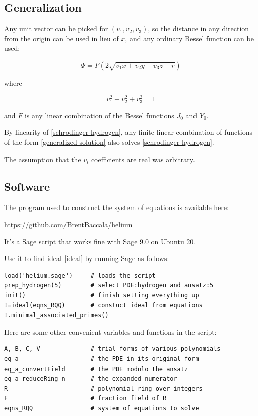 \documentclass{article}
\begin{document}
\subsection*{Generalization}
\parskip 12pt

Any unit vector can be picked for $(v_1, v_2, v_3)$,
so the distance in any direction from the origin can be used in lieu of $x$,
and any ordinary Bessel function can be used:

\begin{equation}
\label{generalized solution}
\Psi = F(2\sqrt{v_1 x+ v_2 y+ v_3 z+r})
\end{equation}

where

\begin{equation*}
v_1^2+v_2^2+v_3^2=1
\end{equation*}

and $F$ is any linear combination of the Bessel functions $J_0$ and $Y_0$.

By linearity of \eqref{schrodinger hydrogen}, any finite linear combination of functions of the form
\eqref{generalized solution} also solves \eqref{schrodinger hydrogen}.

The assumption that the $v_i$ coefficients are real was arbitrary.

\subsection*{Software}

The program used to construct the system of equations is available here:

\centerline{\url{https://github.com/BrentBaccala/helium}}

It's a Sage script that works fine with Sage 9.0 on Ubuntu 20.

Use it to find ideal \eqref{ideal} by
running Sage as follows:

\begin{verbatim}
load('helium.sage')     # loads the script
prep_hydrogen(5)        # select PDE:hydrogen and ansatz:5
init()                  # finish setting everything up
I=ideal(eqns_RQQ)       # constuct ideal from equations
I.minimal_associated_primes()
\end{verbatim}

Here are some other convenient variables and functions in the script:

\begin{verbatim}
A, B, C, V              # trial forms of various polynomials
eq_a                    # the PDE in its original form
eq_a_convertField       # the PDE modulo the ansatz
eq_a_reduceRing_n       # the expanded numerator
R                       # polynomial ring over integers
F                       # fraction field of R
eqns_RQQ                # system of equations to solve
\end{verbatim}
\end{document}
